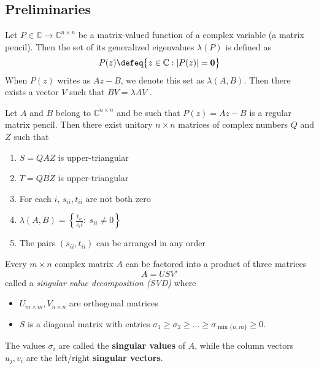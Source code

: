 \documentclass[a4paper,10pt]{article}  %
\begin{document}
\subsection{Preliminaries} %
\label{sub:preliminaries}

\begin{definition}
   Let $ P\in \mathbb{C}\rightarrow \mathbb{C}^{n\times n} $ be a matrix-valued function of a complex variable (a matrix
pencil). Then the set of its generalized eigenvalues $ \lambda( P) $ is defined as
\[
   P(z) \defeq \big\{ z\in \mathbb{C}: \lvert P(z) \rvert = \mathbf{0} \big\}
\]
When $P(z)$ writes as $Az−B$, we denote this set as $\lambda(A,B)$. Then there exists
a vector $V$ such that $BV = \lambda AV$ .
\end{definition}

\begin{theorem}
Let $A$ and $B$ belong to $ \mathbb{C}^{n\times n} $ and be such that $ P(z) = Az - B$ is a regular matrix pencil. Then
there exist unitary $n\times n$ matrices of complex numbers $Q$ and $Z$ such that
\begin{enumerate}
   
   \item $ S = Q A Z $ is upper-triangular
   \item $ T = Q B Z $ is upper-triangular
   \item For each $ i $, $ s_{ii},t_{ii}$ are not both zero
   \item $ \lambda(A,B) = \left\{ \frac{t_{ii}}{s_ii} : \ s_{ii}\ne 0 \right\}$
   \item The pairs $ (s_{ii}, t_{ii} ) $ can be arranged in any order
\end{enumerate}

\end{theorem}

\begin{theorem}
   Every $m\times n $ complex matrix $ A $ can be factored into a product of three matrices
   \begin{equation}
      \label{eq:SVD}
      A = U S V'
   \end{equation}
   called a \emph{singular value decomposition (SVD)} where
   \begin{itemize}%
      
      \item $ U _{m\times m}, V_{n\times n}$ are orthogonal matrices 
      \item $ S $ is a diagonal matrix with entries $ \sigma_1 \ge \sigma_2 \ge \ldots \ge \sigma_{\min\{n,m\}} \ge 0$. 
   \end{itemize}
   The values $ \sigma_i $ are called the \textbf{singular values} of $ A $, while the column vectors $ u_j,v_i $ are
   the left/right \textbf{singular vectors}.
\end{theorem}
\end{document}
